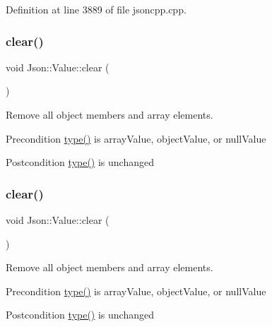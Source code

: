 Definition at line 3889 of file jsoncpp.\+cpp.

\hypertarget{class_json_1_1_value_a501a4d67e6c875255c2ecc03ccd2019b}{}\label{class_json_1_1_value_a501a4d67e6c875255c2ecc03ccd2019b} 
\subsubsection{\texorpdfstring{clear()}{clear()}\hspace{0.1cm}{\footnotesize\ttfamily [1/2]}}
{\footnotesize\ttfamily void Json\+::\+Value\+::clear (\begin{DoxyParamCaption}{ }\end{DoxyParamCaption})}

Remove all object members and array elements. \begin{DoxyPrecond}{Precondition}
\hyperlink{class_json_1_1_value_a8ce61157a011894f0252ceed232312de}{type()} is array\+Value, object\+Value, or null\+Value 
\end{DoxyPrecond}
\begin{DoxyPostcond}{Postcondition}
\hyperlink{class_json_1_1_value_a8ce61157a011894f0252ceed232312de}{type()} is unchanged 
\end{DoxyPostcond}
\hypertarget{class_json_1_1_value_a501a4d67e6c875255c2ecc03ccd2019b}{}\label{class_json_1_1_value_a501a4d67e6c875255c2ecc03ccd2019b} 
\subsubsection{\texorpdfstring{clear()}{clear()}\hspace{0.1cm}{\footnotesize\ttfamily [2/2]}}
{\footnotesize\ttfamily void Json\+::\+Value\+::clear (\begin{DoxyParamCaption}{ }\end{DoxyParamCaption})}

Remove all object members and array elements. \begin{DoxyPrecond}{Precondition}
\hyperlink{class_json_1_1_value_a8ce61157a011894f0252ceed232312de}{type()} is array\+Value, object\+Value, or null\+Value 
\end{DoxyPrecond}
\begin{DoxyPostcond}{Postcondition}
\hyperlink{class_json_1_1_value_a8ce61157a011894f0252ceed232312de}{type()} is unchanged 
\end{DoxyPostcond}


